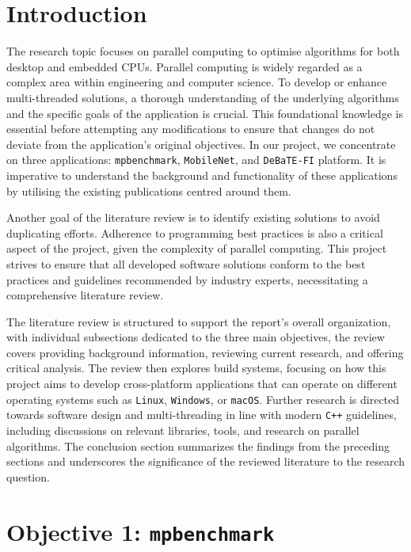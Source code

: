 \section{Introduction}
The research topic focuses on parallel computing to optimise algorithms for both desktop and embedded CPUs. Parallel computing is widely regarded as a complex area within engineering and computer science. To develop or enhance multi-threaded solutions, a thorough understanding of the underlying algorithms and the specific goals of the application is crucial. This foundational knowledge is essential before attempting any modifications to ensure that changes do not deviate from the application’s original objectives. In our project, we concentrate on three applications: \texttt{mpbenchmark}, \texttt{MobileNet}, and \texttt{DeBaTE-FI} platform. It is imperative to understand the background and functionality of these applications by utilising the existing publications centred around them. 

Another goal of the literature review is to identify existing solutions to avoid duplicating efforts. Adherence to programming best practices is also a critical aspect of the project, given the complexity of parallel computing. This project strives to ensure that all developed software solutions conform to the best practices and guidelines recommended by industry experts, necessitating a comprehensive literature review.

The literature review is structured to support the report's overall organization, with individual subsections dedicated to the three main objectives, the review covers providing background information, reviewing current research, and offering critical analysis. The review then explores build systems, focusing on how this project aims to develop cross-platform applications that can operate on different operating systems such as \texttt{Linux}, \texttt{Windows}, or \texttt{macOS}. Further research is directed towards software design and multi-threading in line with modern \texttt{C++} guidelines, including discussions on relevant libraries, tools, and research on parallel algorithms. The conclusion section summarizes the findings from the preceding sections and underscores the significance of the reviewed literature to the research question.

\section{Objective 1: \texttt{mpbenchmark}}

